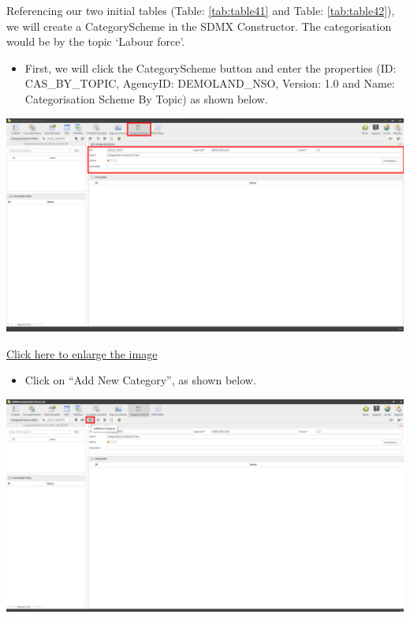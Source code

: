 \documentclass[
]{book}
\providecommand{\tightlist}{%
  \setlength{\itemsep}{0pt}\setlength{\parskip}{0pt}}
\begin{document}
Referencing our two initial tables (Table: \ref{tab:table41} and Table: \ref{tab:table42}), we will create a CategoryScheme in the SDMX Constructor. The categorisation would be by the topic `Labour force'.

\begin{itemize}
\tightlist
\item
  First, we will click the CategoryScheme button and enter the properties (ID: CAS\_BY\_TOPIC, AgencyID: DEMOLAND\_NSO, Version: 1.0 and Name: Categorisation Scheme By Topic) as shown below.
\end{itemize}

\begin{center}\includegraphics[width=1\linewidth]{./images/image160} \end{center}

\href{images/image160.png}{Click here to enlarge the image}

\begin{itemize}
\tightlist
\item
  Click on ``Add New Category'', as shown below.
\end{itemize}

\begin{center}\includegraphics[width=1\linewidth]{./images/image162} \end{center}
\end{document}

